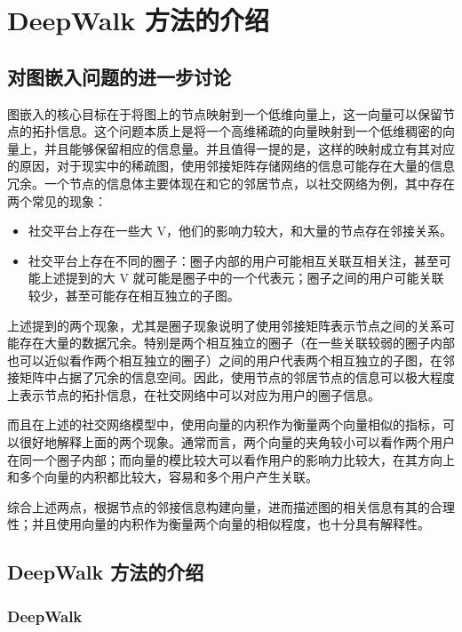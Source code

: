 \documentclass{ctexart}
\begin{document}
\section{DeepWalk 方法的介绍}

\subsection{对图嵌入问题的进一步讨论}

图嵌入的核心目标在于将图上的节点映射到一个低维向量上，这一向量可以保留节点的拓扑信息。这个问题本质上是将一个高维稀疏的向量映射到一个低维稠密的向量上，并且能够保留相应的信息量。并且值得一提的是，这样的映射成立有其对应的原因，对于现实中的稀疏图，使用邻接矩阵存储网络的信息可能存在大量的信息冗余。一个节点的信息体主要体现在和它的邻居节点，以社交网络为例，其中存在两个常见的现象：

\begin{itemize}
    \item 社交平台上存在一些大 V，他们的影响力较大，和大量的节点存在邻接关系。
    \item 社交平台上存在不同的圈子：圈子内部的用户可能相互关联互相关注，甚至可能上述提到的大 V 就可能是圈子中的一个代表元；圈子之间的用户可能关联较少，甚至可能存在相互独立的子图。
\end{itemize}

上述提到的两个现象，尤其是圈子现象说明了使用邻接矩阵表示节点之间的关系可能存在大量的数据冗余。特别是两个相互独立的圈子（在一些关联较弱的圈子内部也可以近似看作两个相互独立的圈子）之间的用户代表两个相互独立的子图，在邻接矩阵中占据了冗余的信息空间。因此，使用节点的邻居节点的信息可以极大程度上表示节点的拓扑信息，在社交网络中可以对应为用户的圈子信息。

而且在上述的社交网络模型中，使用向量的内积作为衡量两个向量相似的指标，可以很好地解释上面的两个现象。通常而言，两个向量的夹角较小可以看作两个用户在同一个圈子内部；而向量的模比较大可以看作用户的影响力比较大，在其方向上和多个向量的内积都比较大，容易和多个用户产生关联。

综合上述两点，根据节点的邻接信息构建向量，进而描述图的相关信息有其的合理性；并且使用向量的内积作为衡量两个向量的相似程度，也十分具有解释性。

\subsection{DeepWalk 方法的介绍}

\subsubsection{DeepWalk}
\end{document}
